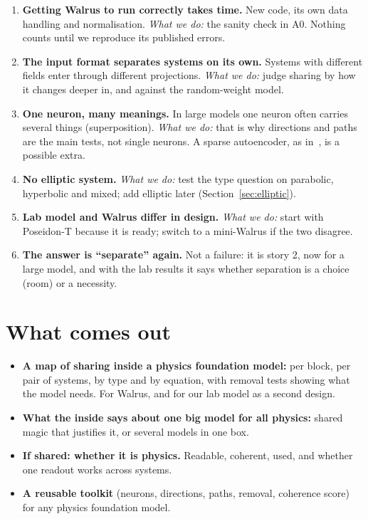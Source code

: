 \documentclass[11pt,a4paper]{article}
\begin{document}
\begin{enumerate}[itemsep=0.8em]
  \item \textbf{Getting Walrus to run correctly takes time.} New code, its own data handling and normalisation.
  \emph{What we do:} the sanity check in A0. Nothing counts until we reproduce its published errors.
  \item \textbf{The input format separates systems on its own.} Systems with different fields enter through different projections.
  \emph{What we do:} judge sharing by how it changes deeper in, and against the random-weight model.
  \item \textbf{One neuron, many meanings.} In large models one neuron often carries several things (superposition).
  \emph{What we do:} that is why directions and paths are the main tests, not single neurons.
  A sparse autoencoder, as in~\cite{rosenfeld2026}, is a possible extra.
  \item \textbf{No elliptic system.} \emph{What we do:} test the type question on parabolic, hyperbolic and mixed;
  add elliptic later (Section~\ref{sec:elliptic}).
  \item \textbf{Lab model and Walrus differ in design.} \emph{What we do:} start with Poseidon-T because it is ready;
  switch to a mini-Walrus if the two disagree.
  \item \textbf{The answer is ``separate'' again.} Not a failure: it is story 2, now for a large model, and with the lab results
  it says whether separation is a choice (room) or a necessity.
\end{enumerate}

\section{What comes out}

\begin{itemize}[itemsep=0.7em]
  \item \textbf{A map of sharing inside a physics foundation model:} per block, per pair of systems, by type and by equation,
  with removal tests showing what the model needs. For Walrus, and for our lab model as a second design.
  \item \textbf{What the inside says about one big model for all physics:} shared magic that justifies it, or several models in one box.
  \item \textbf{If shared: whether it is physics.} Readable, coherent, used, and whether one readout works across systems.
  \item \textbf{A reusable toolkit} (neurons, directions, paths, removal, coherence score) for any physics foundation model.
\end{itemize}
\end{document}
